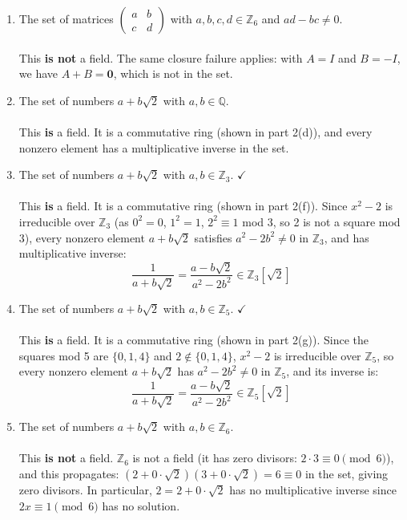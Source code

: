 \documentclass{article}
\newcommand{\Q}{\mathbb{Q}}
\newcommand{\Zn}[1]{\mathbb{Z}_{#1}}
\begin{document}
\begin{enumerate}
\begin{enumerate}
            \item The set of matrices $\begin{pmatrix}a&b\\c&d\end{pmatrix}$ with $a,b,c,d \in \Zn{6}$ and $ad-bc \neq 0$.
            \\
            \\ This \textbf{is not} a field. The same closure failure applies: with $A=I$ and $B=-I$, we have $A+B=\mathbf{0}$, which is not in the set. 

            \item The set of numbers $a+b\sqrt{2}$ with $a,b \in \Q$.
            \\
            \\ This \textbf{is} a field. It is a commutative ring (shown in part 2(d)), and every nonzero element has a multiplicative inverse in the set.

            \item The set of numbers $a+b\sqrt{2}$ with $a,b \in \Zn{3}$. $\checkmark$
            \\
            \\ This \textbf{is} a field. It is a commutative ring (shown in part 2(f)). Since $x^2-2$ is irreducible over $\Zn{3}$ (as $0^2=0$, $1^2=1$, $2^2\equiv 1$ mod 3, so 2 is not a square mod 3), every nonzero element $a+b\sqrt{2}$ satisfies $a^2-2b^2 \neq 0$ in $\Zn{3}$, and has multiplicative inverse:
            \[
                \frac{1}{a+b\sqrt{2}} = \frac{a-b\sqrt{2}}{a^2-2b^2} \in \Zn{3}[\sqrt{2}]
            \]

            \item The set of numbers $a+b\sqrt{2}$ with $a,b \in \Zn{5}$. $\checkmark$
            \\
            \\ This \textbf{is} a field. It is a commutative ring (shown in part 2(g)). Since the squares mod 5 are $\{0,1,4\}$ and $2 \notin \{0,1,4\}$, $x^2-2$ is irreducible over $\Zn{5}$, so every nonzero element $a+b\sqrt{2}$ has $a^2-2b^2 \neq 0$ in $\Zn{5}$, and its inverse is:
            \[
                \frac{1}{a+b\sqrt{2}} = \frac{a-b\sqrt{2}}{a^2-2b^2} \in \Zn{5}[\sqrt{2}]
            \]

            \item The set of numbers $a+b\sqrt{2}$ with $a,b \in \Zn{6}$.
            \\
            \\ This \textbf{is not} a field. $\Zn{6}$ is not a field (it has zero divisors: $2\cdot 3 \equiv 0 \pmod{6}$), and this propagates: $(2+0\cdot\sqrt{2})(3+0\cdot\sqrt{2})=6\equiv 0$ in the set, giving zero divisors. In particular, $2=2+0\cdot\sqrt{2}$ has no multiplicative inverse since $2x\equiv 1\pmod{6}$ has no solution.


\end{enumerate}
\end{enumerate}
\end{document}
